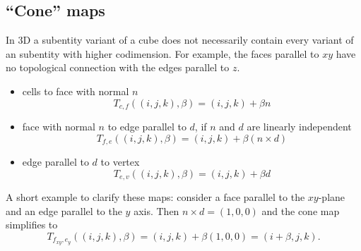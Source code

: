 \documentclass[a4paper,11pt]{article}
\begin{document}
\subsection{``Cone'' maps}
\label{sec:cone-maps}

In 3D a subentity variant of a cube does not necessarily contain every variant
of an subentity with higher codimension. For example, the faces parallel to $xy$
have no topological connection with the edges parallel to $z$.
\begin{itemize}
\item cells to face with normal $n$
  \begin{equation}
    \label{eq:block-cell-face}
    T_{c,f}((i,j,k), \beta) = (i, j, k) + \beta n
  \end{equation}
\item face with normal $n$ to edge parallel to $d$, if $n$ and $d$ are
  linearly independent
  \begin{equation}
    \label{eq:block-face-edge}
    T_{f,e} ((i,j,k), \beta) = (i, j, k) + \beta (n\times d)
  \end{equation}
\item edge parallel to $d$ to vertex
  \begin{equation}
    \label{eq:block-edge-vertex}
    T_{e,v} ((i,j,k), \beta) = (i, j, k) + \beta d
  \end{equation}
\end{itemize}

A short example to clarify these maps: consider a face parallel to the
$xy$-plane and an edge parallel to the $y$ axis. Then $n \times d = (1,0,0)$ and
the cone map simplifies to
\begin{equation}
  \label{eq:block-fxy-ey}
  T_{f_{xy},e_y} ((i,j,k), \beta) = (i,j,k) + \beta (1,0,0) = (i + \beta, j, k).
\end{equation}
\end{document}
